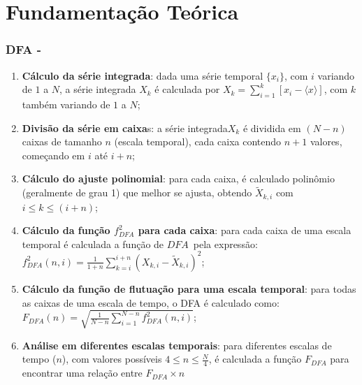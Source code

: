 \documentclass[11pt, aspectratio=169]{beamer}
\newcommand{\dfa}{$DFA$}
\begin{document}
\section{Fundamentação Teórica}


\begin{frame}[allowframebreaks]
\frametitle{DFA - \cite{Peng_1994}}
\begin{enumerate}
\item \textbf{Cálculo da série integrada}: dada uma série temporal $\{x_{i}\}$, com $i$ variando de $1$ a $N$, a série integrada $X_{k}$ é calculada por $X_{k} = \sum_{i=1}^{k}\left[x_{i} - \langle x \rangle \right]$, com $k$ também variando de $1$ a $N$;
\item \textbf{Divisão da série em caixa}s: a série integrada$X_{k}$ é dividida em $(N - n)$ caixas de tamanho $n$ (escala temporal), cada caixa contendo $n + 1$ valores, começando em $i$ até $i + n$;
\item \textbf{Cálculo do ajuste polinomial}: para cada caixa, é calculado polinômio (geralmente de grau 1) que melhor se ajusta, obtendo $\widetilde{X}_{k, i}$ com $i \le k \le (i + n)$;
\item \textbf{Cálculo da função $f_{DFA}^{2}$ para cada caixa}: para cada caixa de uma escala temporal é calculada a função de \dfa~pela expressão:\\[10pt]
 $f_{DFA}^{2}(n, i) = \frac{1}{1+n} \sum_{k=i}^{i + n}(X_{k,i}-\widetilde{X}_{k,i})^{2}$;
\item \textbf{Cálculo da função de flutuação para uma escala temporal}: para todas as caixas de uma escala de tempo, o DFA é calculado como: \\[10pt]
        $F_{DFA}(n) = \sqrt{\frac{1}{N - n} \sum_{i=1}^{N-n} f_{DFA}^{2}(n, i)}$;
\item \textbf{Análise em diferentes escalas temporais}: para diferentes escalas de tempo ($n$), com valores possíveis $4 \le n \le \frac{N}{4}$, é calculada a função $F_{DFA}$ para encontrar uma relação entre $F_{DFA} \times n$
  \end{enumerate}

\end{frame}
\end{document}
